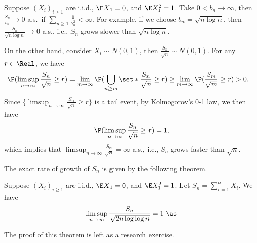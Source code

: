 \documentclass[../aipt.tex]{subfiles}
\begin{document}
Suppose $(X_i)_{i\geq 1 }$ are i.i.d., $\E X_1 =0$, and $\E X_1^2=1$. Take $0<b_n\to \infty$, then $\frac{S_n}{b_n} \to 0$ a.s.\ if $\sum_{n\geq 1} \frac{1}{b_n^2}<\infty$. For example, if we choose $b_n=\sqrt{n\log n}$, then $\frac{S_n}{\sqrt{n\log n}}\to 0 $ a.s., i.e., $S_n$ grows slower than $\sqrt{n\log n}$. 

On the other hand, consider $X_i \sim N(0,1)$, then $\frac{S_n}{\sqrt n}\sim N(0,1)$. For any $r\in\Real$, we have
\begin{align*}
\P(\limsup_{n\to \infty} \frac{S_n}{\sqrt n}\geq r) &= \lim_{m\to \infty} \P(\bigcup_{n\geq m} \set*{\frac{S_n}{\sqrt n}\geq r}) \geq \lim_{m\to \infty} \P(\frac{S_m}{\sqrt m}\geq r)>0.
\end{align*}
Since $\{\limsup_{n\to \infty} \frac{S_n}{\sqrt n}\geq r\}$ is a tail event, by Kolmogorov’s 0-1 law, we then have 
\begin{align*}
\P(\limsup_{n\to \infty} \frac{S_n}{\sqrt n}\geq r) = 1,
\end{align*}
which implies that $\limsup_{n\to \infty} \frac{S_n}{\sqrt n}=\infty$ a.s., i.e., $S_n$ grows faster than $\sqrt{n}$. 

The exact rate of growth of $S_n$ is given by the following theorem.

\begin{Theorem} 
Suppose $(X_i)_{i\geq 1 }$ are i.i.d., $\E X_1 =0$, and $\E X_1^2=1$. Let $S_n = \sum_{i=1}^n X_i$. We have
\begin{align*}
\limsup_{n \to \infty} \frac{S_n}{\sqrt{2n \log \log n}}=1\ \as
\end{align*}
\end{Theorem}

The proof of this theorem is left as a research exercise. 


%

\end{document}
